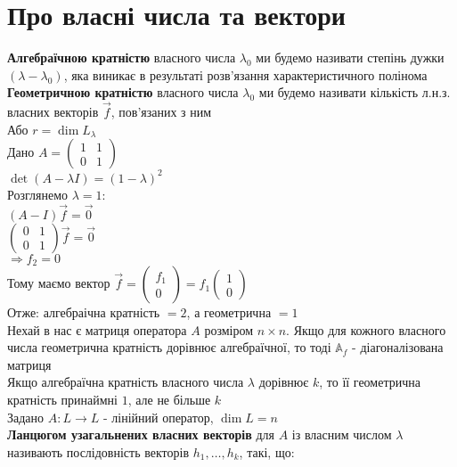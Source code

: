 \documentclass[a4paper, 10pt]{article}
\theoremstyle{theoremdd}
\begin{document}
\section*{Про власні числа та вектори}
 \textbf{Алгебраїчною кратністю} власного числа $\lambda_0$ ми будемо називати степінь дужки $(\lambda - \lambda_0)$, яка виникає в результаті розв'язання характеристичного полінома
\bigskip \\
 \textbf{Геометричною кратністю} власного числа $\lambda_0$ ми будемо називати кількість л.н.з. власних векторів $\vec{f}$, пов'язаних з ним\\
Або $r = \dim L_{\lambda}$
\bigskip \\
\ex{} Дано $A = \begin{pmatrix}
1 & 1 \\
0 & 1
\end{pmatrix}$\\
$\det(A-\lambda I) = (1-\lambda)^2$\\
Розглянемо $\lambda = 1$:\\
$(A-I)\vec{f} = \vec{0}$\\
$\begin{pmatrix}
0 & 1 \\
0 & 1
\end{pmatrix} \vec{f} = \vec{0}$\\
$\Rightarrow f_2 = 0$\\
Тому маємо вектор $\vec{f} = \begin{pmatrix}
f_1 \\ 0
\end{pmatrix} = f_1 \begin{pmatrix}
1 \\ 0
\end{pmatrix}$\\
Отже: алгебраічна кратність $= 2$, а геометрична $= 1$
\bigskip \\
\crl{} Нехай в нас є матриця оператора $A$ розміром $n \times n$. Якщо для кожного власного числа геометрична кратність дорівнює алгебраїчної, то тоді $\mathbb{A}_f$ - діагоналізована матриця
\bigskip \\
\th{} Якщо алгебраїчна кратність власного числа $\lambda$ дорівнює $k$, то її геометрична кратність принаймні $1$, але не більше $k$
\bigskip \\
 Задано $A: L \to L$ - лінійний оператор, $\dim L = n$\\
\textbf{Ланцюгом узагальнених власних векторів} для $A$ із власним числом $\lambda$ називають послідовність векторів $h_1, \dots, h_k$, такі, що:\\
\end{document}
